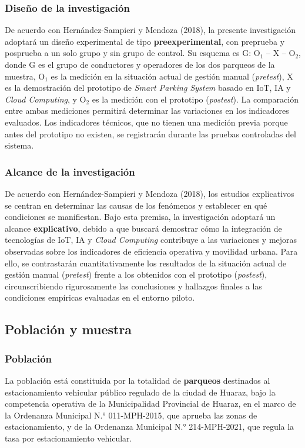 \documentclass[12pt,a4paper]{article}
\begin{document}
\subsubsection{Diseño de la investigación}
De acuerdo con Hernández-Sampieri y Mendoza (2018), la presente investigación adoptará un diseño experimental de tipo \textbf{preexperimental}, con preprueba y posprueba a un solo grupo y sin grupo de control. Su esquema es G: O$_1$ -- X -- O$_2$, donde G es el grupo de conductores y operadores de los dos parqueos de la muestra, O$_1$ es la medición en la situación actual de gestión manual (\textit{pretest}), X es la demostración del prototipo de \textit{Smart Parking System} basado en IoT, IA y \textit{Cloud Computing}, y O$_2$ es la medición con el prototipo (\textit{postest}). La comparación entre ambas mediciones permitirá determinar las variaciones en los indicadores evaluados. Los indicadores técnicos, que no tienen una medición previa porque antes del prototipo no existen, se registrarán durante las pruebas controladas del sistema.


\subsubsection{Alcance de la investigación}

De acuerdo con Hernández-Sampieri y Mendoza (2018), los estudios explicativos se centran en determinar las causas de los fenómenos y establecer en qué condiciones se manifiestan. Bajo esta premisa, la investigación adoptará un alcance \textbf{explicativo}, debido a que buscará demostrar cómo la integración de tecnologías de IoT, IA y \textit{Cloud Computing} contribuye a las variaciones y mejoras observadas sobre los indicadores de eficiencia operativa y movilidad urbana. Para ello, se contrastarán cuantitativamente los resultados de la situación actual de gestión manual (\textit{pretest}) frente a los obtenidos con el prototipo (\textit{postest}), circunscribiendo rigurosamente las conclusiones y hallazgos finales a las condiciones empíricas evaluadas en el entorno piloto.

\subsection{Población y muestra}

\subsubsection{Población}
La población está constituida por la totalidad de \textbf{parqueos} destinados al estacionamiento vehicular público regulado de la ciudad de Huaraz, bajo la competencia operativa de la Municipalidad Provincial de Huaraz, en el marco de la Ordenanza Municipal N.° 011-MPH-2015, que aprueba las zonas de estacionamiento, y de la Ordenanza Municipal N.° 214-MPH-2021, que regula la tasa por estacionamiento vehicular.
\end{document}
